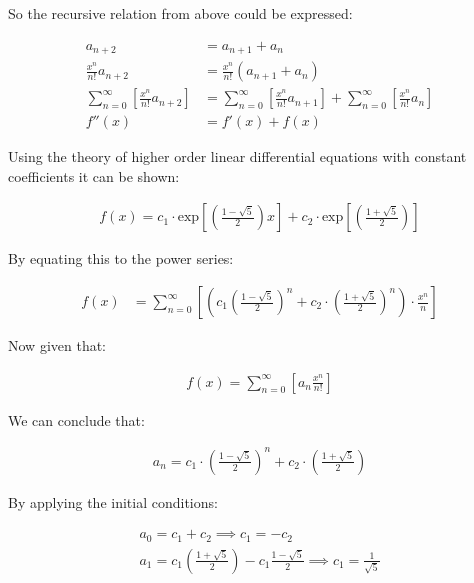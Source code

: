 \documentclass[11pt]{article}
\begin{document}
\begin{enumerate}
So the recursive relation from above could be expressed:


\begin{align*}
a_{n+  2}    &= a_{n+  1} +  a_{n}\\
\frac{x^n}{n!}   a_{n+  2}    &= \frac{x^n}{n!}\left( a_{n+  1} +  a_{n}  \right)\\
\sum^{\infty}_{n= 0} \left[ \frac{x^n}{n!}   a_{n+  2} \right]        &= \sum^{\infty}_{n= 0}   \left[ \frac{x^n}{n!} a_{n+  1} \right]  + \sum^{\infty}_{n= 0}   \left[ \frac{x^n}{n!} a_{n}  \right]  \\
f''\left( x \right) &= f'\left( x \right)+  f\left( x \right)
\end{align*}


Using the theory of higher order linear differential equations with
constant coefficients it can be shown:


\begin{align*}
f\left( x \right)= c_1 \cdot  \mathrm{exp}\left[ \left( \frac{1- \sqrt{5} }{2} \right)x \right] +  c_2 \cdot  \mathrm{exp}\left[ \left( \frac{1 +  \sqrt{5} }{2} \right) \right]
\end{align*}


By equating this to the power series:


\begin{align*}
f\left( x \right)&= \sum^{\infty}_{n= 0}   \left[ \left( c_1\left( \frac{1- \sqrt{5} }{2} \right)^n +  c_2 \cdot  \left( \frac{1+ \sqrt{5} }{2} \right)^n \right) \cdot  \frac{x^n}{n} \right]
\end{align*}


Now given that:


\begin{align*}
f\left( x \right)= \sum^{\infty}_{n= 0}   \left[ a_n \frac{x^n}{n!} \right]
\end{align*}


We can conclude that:


\begin{align*}
a_n = c_1\cdot  \left( \frac{1- \sqrt{5} }{2} \right)^n +  c_2 \cdot  \left( \frac{1+  \sqrt{5} }{2} \right)
\end{align*}


By applying the initial conditions:


\begin{align*}
a_0= c_1 +  c_2  \implies  c_1= - c_2\\
a_1= c_1 \left( \frac{1+ \sqrt{5} }{2} \right) -  c_1 \frac{1-\sqrt{5} }{2}  \implies  c_1 = \frac{1}{\sqrt{5} }
\end{align*}



\end{enumerate}
\end{document}
